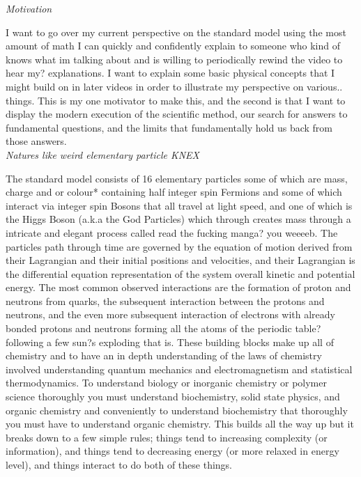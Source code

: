 \documentclass{article}
\begin{document}
\textit{Motivation}

I want to go over my current perspective on the standard model using the most amount of math I can quickly and confidently explain to someone who kind of knows what im talking about and is willing to periodically rewind the video to hear my? explanations.  I want to explain some basic physical concepts that I might build on in later videos in order to illustrate my perspective on various.. things. This is my one motivator to make this, and the second is that I want to display the modern execution of the scientific method, our search for answers to fundamental questions, and the limits that fundamentally hold us back from those answers. \\

\textit{Natures like weird elementary particle KNEX}

The standard model consists of 16 elementary particles some of which are mass, charge and or colour* containing half integer spin Fermions and some of which interact via integer spin Bosons that all travel at light speed, and one of which is the Higgs Boson (a.k.a the God Particles) which through creates mass through a intricate and elegant process called read the fucking manga? you weeeeb. The particles path through time are governed by the equation of motion derived from their Lagrangian and their initial positions and velocities, and their Lagrangian is the differential equation representation of the system overall kinetic and potential energy. The most common observed interactions are the formation of proton and neutrons from quarks, the subsequent interaction between the protons and neutrons, and the even more subsequent interaction of electrons with already bonded protons and neutrons forming all the atoms of the periodic table? following a few sun?s exploding that is. These building blocks make up all of chemistry and to have an in depth understanding of the laws of chemistry involved understanding quantum mechanics and electromagnetism and statistical thermodynamics. To understand biology or inorganic chemistry or polymer science thoroughly you must understand biochemistry, solid state physics, and organic chemistry and conveniently to understand biochemistry that thoroughly you must have to understand organic chemistry. This builds all the way up but it breaks down to a few simple rules; things tend to increasing complexity (or information), and things tend to decreasing energy (or more relaxed in energy level), and things interact to do both of these things. \\
\\
\end{document}
